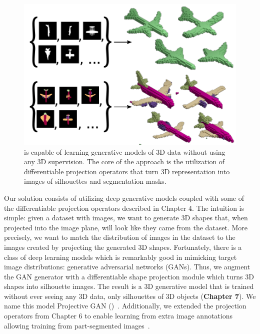 \begin{figure}
\vspace{-20pt}
 \begin{center}
 \includegraphics[width=0.8\linewidth]{figs/prganpp.png}
 \end{center}
 \vspace{-20pt}
 \caption{\small \prgan is capable of learning generative models of 3D data without using any 3D supervision.
 The core of the approach is the utilization of differentiable projection operators
 that turn 3D representation into images of silhouettes and segmentation masks.}
 \vspace{-5pt}
\end{figure}
Our solution consists of utilizing deep generative models coupled with some of the differentiable projection operators described in Chapter 4.
The intuition is simple: given a dataset with images, we want to generate 3D shapes that, when projected into the image plane, will look like they came from the dataset.
More precisely, we want to match the distribution of images in the dataset to the images created by projecting the generated 3D shapes.
Fortunately, there is a class of deep learning models which is remarkably good in mimicking target image
distributions: generative adversarial networks (GANs).
Thus, we augment the GAN generator with a differentiable shape projection module which turns 3D shapes into silhouette images.
The result is a 3D generative model that is trained without ever seeing any 3D data, only silhouettes of 3D objects (\textbf{Chapter 7}).
We name this model Projective GAN (\prgan)~\cite{prgan,prganijcv}.
Additionally, we extended the projection operators from Chapter 6 to enable learning from extra image annotations 
allowing training \prgans from
part-segmented images~\cite{prganijcv}.
